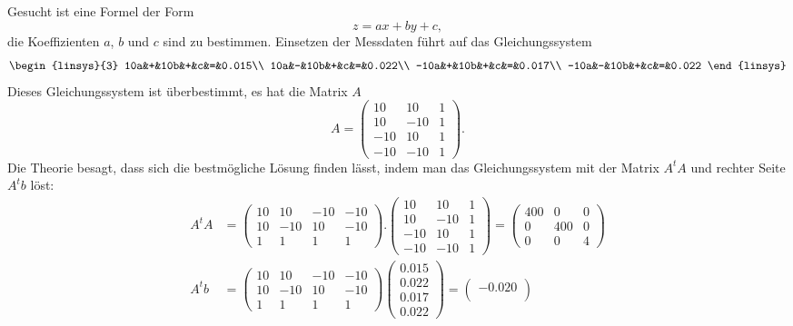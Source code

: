 \begin{loesung}
\begin{teilaufgaben}
\item
Gesucht ist eine Formel der Form
\[
z=ax+by+c,
\]
die Koeffizienten $a$, $b$ und $c$ sind zu bestimmen. Einsetzen der Messdaten
führt auf das Gleichungssystem
\[
\begin{linsys}{3}
 10a&+&10b&+&c&=&0.015\\
 10a&-&10b&+&c&=&0.022\\
-10a&+&10b&+&c&=&0.017\\
-10a&-&10b&+&c&=&0.022
\end{linsys}
\]
Dieses Gleichungssystem ist überbestimmt, es hat die Matrix $A$
\[
A
=
\begin{pmatrix}
 10& 10&1\\
 10&-10&1\\
-10& 10&1\\
-10&-10&1
\end{pmatrix}.
\]
Die Theorie besagt, dass sich die bestmögliche Lösung finden lässt,
indem man das Gleichungssystem mit der Matrix $A^tA$ und rechter Seite
$A^tb$ löst:
\begin{align*}
A^tA
&=
\begin{pmatrix}
 10& 10&-10&-10\\
 10&-10& 10&-10\\
  1&  1&  1&  1
\end{pmatrix}.
\begin{pmatrix}
 10& 10&1\\
 10&-10&1\\
-10& 10&1\\
-10&-10&1
\end{pmatrix}
=
\begin{pmatrix}
400&  0&  0\\
  0&400&  0\\
  0&  0&  4
\end{pmatrix}
\\
A^tb
&=
\begin{pmatrix}
 10& 10&-10&-10\\
 10&-10& 10&-10\\
  1&  1&  1&  1
\end{pmatrix}
\begin{pmatrix}
0.015\\0.022\\0.017\\0.022
\end{pmatrix}
=
\begin{pmatrix}
-0.020\\

\end{pmatrix}
\end{align*}
\end{teilaufgaben}
\end{loesung}

